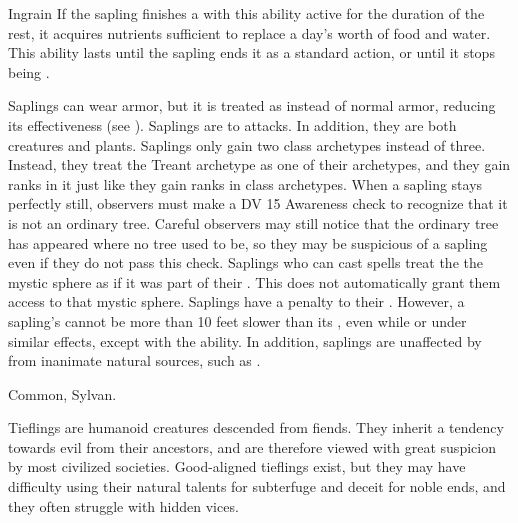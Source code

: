 \begin{raggeditemize}
\begin{activeability}{Ingrain}{}
        If the sapling finishes a  with this ability active for the duration of the rest, it acquires nutrients sufficient to replace a day's worth of food and water.
        This ability lasts until the sapling ends it as a standard action, or until it stops being .
      \end{activeability}
     Saplings can wear armor, but it is treated as  instead of normal armor, reducing its effectiveness (see ).
     Saplings are \vulnerable to \atFire attacks. In addition, they are both creatures and plants.
     Saplings only gain two class archetypes instead of three.
      Instead, they treat the Treant archetype as one of their archetypes, and they gain ranks in it just like they gain ranks in class archetypes.
     When a sapling stays perfectly still, observers must make a DV 15 Awareness check to recognize that it is not an ordinary tree.
      Careful observers may still notice that the ordinary tree has appeared where no tree used to be, so they may be suspicious of a sapling even if they do not pass this check.
     Saplings who can cast spells treat the the  mystic sphere as if it was part of their .
      This does not automatically grant them access to that mystic sphere.
     Saplings have a  penalty to their .
      However, a sapling's  cannot be more than 10 feet slower than its , even while \slowed or under similar effects, except with the  ability.
      In addition, saplings are unaffected by  from inanimate natural sources, such as .
  \end{raggeditemize}
   Common, Sylvan.



\label{Tiefling}

  Tieflings are humanoid creatures descended from fiends.
  They inherit a tendency towards evil from their ancestors, and are therefore viewed with great suspicion by most civilized societies.
  Good-aligned tieflings exist, but they may have difficulty using their natural talents for subterfuge and deceit for noble ends, and they often struggle with hidden vices.

